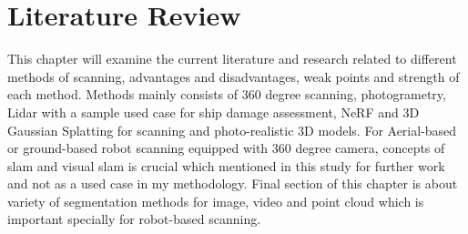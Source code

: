 
\section{Literature Review}

\noindent This chapter will examine the current literature and research related to different methods of scanning, advantages and disadvantages, weak points and strength of each method. Methods mainly  consists of 360 degree scanning, photogrametry, Lidar with a sample used case for ship damage assessment, NeRF and 3D Gaussian Splatting for scanning and photo-realistic 3D models. For Aerial-based or ground-based robot scanning equipped with 360 degree camera, concepts of slam and visual slam is crucial which mentioned in this study for further work and not as a used case in my methodology. Final section of this chapter is about variety of segmentation methods for image, video and point cloud which is important specially for robot-based scanning. 
